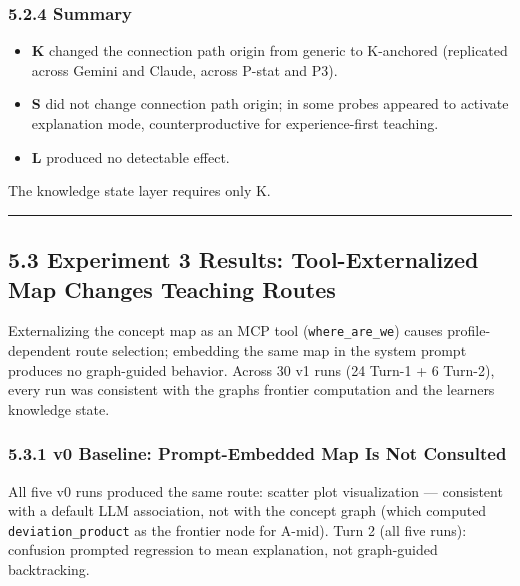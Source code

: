\documentclass[
]{article}
\providecommand{\tightlist}{%
  \setlength{\itemsep}{0pt}\setlength{\parskip}{0pt}}
\begin{document}
\subsubsection{5.2.4 Summary}\label{524-summary}

\begin{itemize}
\tightlist
\item
  \textbf{K} changed the connection path origin from generic to K-anchored (replicated across Gemini and Claude, across P-stat and P3).
\item
  \textbf{S} did not change connection path origin; in some probes appeared to activate explanation mode, counterproductive for experience-first teaching.
\item
  \textbf{L} produced no detectable effect.
\end{itemize}

The knowledge state layer requires only K.

\begin{center}\rule{0.5\linewidth}{0.5pt}\end{center}

\subsection{5.3 Experiment 3 Results: Tool-Externalized Map Changes Teaching Routes}\label{53-experiment-3-results-tool-externalized-map-changes-teaching-routes}

Externalizing the concept map as an MCP tool (\texttt{where\_are\_we}) causes profile-dependent route selection; embedding the same map in the system prompt produces no graph-guided behavior. Across 30 v1 runs (24 Turn-1 + 6 Turn-2), every run was consistent with the graph\textquotesingle s frontier computation and the learner\textquotesingle s knowledge state.

\subsubsection{5.3.1 v0 Baseline: Prompt-Embedded Map Is Not Consulted}\label{531-v0-baseline-prompt-embedded-map-is-not-consulted}

All five v0 runs produced the same route: scatter plot visualization --- consistent with a default LLM association, not with the concept graph (which computed \texttt{deviation\_product} as the frontier node for A-mid). Turn 2 (all five runs): confusion prompted regression to mean explanation, not graph-guided backtracking.
\end{document}
